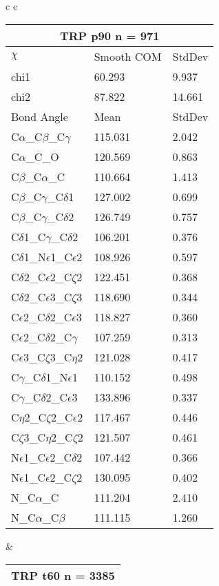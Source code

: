\begin{longtable}{ c c }
  \\
  \begin{tabular}{ l l l }
  \toprule
  \multicolumn{3}{c}{TRP \textbf{p90} n = 971} \\ \toprule
  $\chi$       & Smooth COM & StdDev \\ \midrule
  chi1 & 60.293 & 9.937 \\ 
  chi2 & 87.822 & 14.661 \\ \midrule
  Bond Angle   & Mean     & StdDev \\ \midrule
  C$\alpha$\_C$\beta$\_C$\gamma$ & 115.031 & 2.042\\
  C$\alpha$\_C\_O & 120.569 & 0.863\\
  C$\beta$\_C$\alpha$\_C & 110.664 & 1.413\\
  C$\beta$\_C$\gamma$\_C$\delta$1 & 127.002 & 0.699\\
  C$\beta$\_C$\gamma$\_C$\delta$2 & 126.749 & 0.757\\
  C$\delta$1\_C$\gamma$\_C$\delta$2 & 106.201 & 0.376\\
  C$\delta$1\_N$\epsilon$1\_C$\epsilon$2 & 108.926 & 0.597\\
  C$\delta$2\_C$\epsilon$2\_C$\zeta$2 & 122.451 & 0.368\\
  C$\delta$2\_C$\epsilon$3\_C$\zeta$3 & 118.690 & 0.344\\
  C$\epsilon$2\_C$\delta$2\_C$\epsilon$3 & 118.827 & 0.360\\
  C$\epsilon$2\_C$\delta$2\_C$\gamma$ & 107.259 & 0.313\\
  C$\epsilon$3\_C$\zeta$3\_C$\eta$2 & 121.028 & 0.417\\
  C$\gamma$\_C$\delta$1\_N$\epsilon$1 & 110.152 & 0.498\\
  C$\gamma$\_C$\delta$2\_C$\epsilon$3 & 133.896 & 0.337\\
  C$\eta$2\_C$\zeta$2\_C$\epsilon$2 & 117.467 & 0.446\\
  C$\zeta$3\_C$\eta$2\_C$\zeta$2 & 121.507 & 0.461\\
  N$\epsilon$1\_C$\epsilon$2\_C$\delta$2 & 107.442 & 0.366\\
  N$\epsilon$1\_C$\epsilon$2\_C$\zeta$2 & 130.095 & 0.402\\
  N\_C$\alpha$\_C & 111.204 & 2.410\\
  N\_C$\alpha$\_C$\beta$ & 111.115 & 1.260\\
  \bottomrule
  \end{tabular}
  &
  \begin{tabular}{ l l l }
  \toprule
  \multicolumn{3}{c}{TRP \textbf{t60} n = 3385} \\ \toprule

\end{tabular}
\end{longtable}
